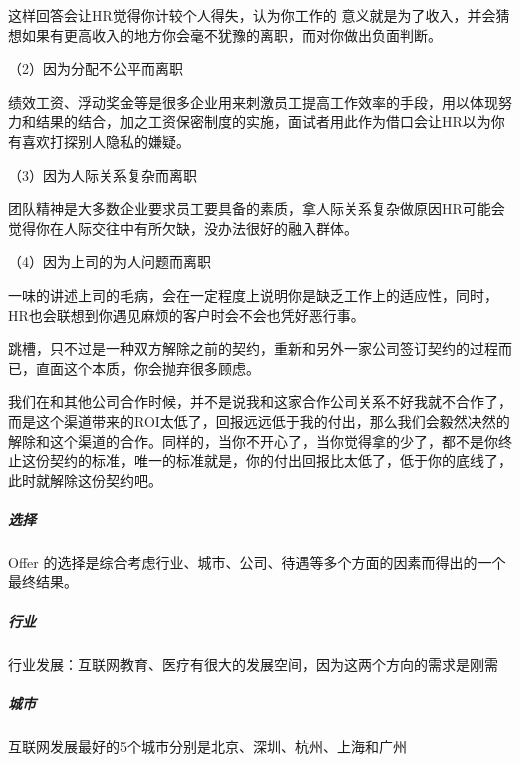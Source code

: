 \documentclass[letterpaper,10pt,english]{sphinxmanual}
\begin{document}
这样回答会让HR觉得你计较个人得失，认为你工作的
意义就是为了收入，并会猜想如果有更高收入的地方你会毫不犹豫的离职，而对你做出负面判断。

（2）因为分配不公平而离职

绩效工资、浮动奖金等是很多企业用来刺激员工提高工作效率的手段，用以体现努力和结果的结合，加之工资保密制度的实施，面试者用此作为借口会让HR以为你有喜欢打探别人隐私的嫌疑。

（3）因为人际关系复杂而离职

团队精神是大多数企业要求员工要具备的素质，拿人际关系复杂做原因HR可能会觉得你在人际交往中有所欠缺，没办法很好的融入群体。

（4）因为上司的为人问题而离职

一味的讲述上司的毛病，会在一定程度上说明你是缺乏工作上的适应性，同时，HR也会联想到你遇见麻烦的客户时会不会也凭好恶行事。

跳槽，只不过是一种双方解除之前的契约，重新和另外一家公司签订契约的过程而已，直面这个本质，你会抛弃很多顾虑。

我们在和其他公司合作时候，并不是说我和这家合作公司关系不好我就不合作了，而是这个渠道带来的ROI太低了，回报远远低于我的付出，那么我们会毅然决然的解除和这个渠道的合作。同样的，当你不开心了，当你觉得拿的少了，都不是你终止这份契约的标准，唯一的标准就是，你的付出回报比太低了，低于你的底线了，此时就解除这份契约吧。%
\begin{footnote}[894]\sphinxAtStartFootnote
{}
%
\end{footnote}


\subparagraph{选择}
\label{\detokenize{chapter_interview/HR:id9}}
Offer
的选择是综合考虑行业、城市、公司、待遇等多个方面的因素而得出的一个最终结果。


\subparagraph{行业}
\label{\detokenize{chapter_interview/HR:id10}}
行业发展：互联网教育、医疗有很大的发展空间，因为这两个方向的需求是刚需


\subparagraph{城市}
\label{\detokenize{chapter_interview/HR:id11}}
互联网发展最好的5个城市分别是北京、深圳、杭州、上海和广州

%
\begin{footnote}[895]\sphinxAtStartFootnote
{}
%
\end{footnote}
\end{document}
